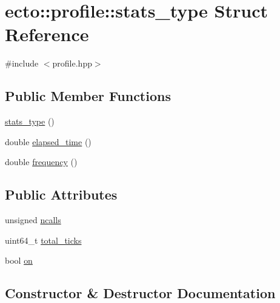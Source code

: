 \hypertarget{structecto_1_1profile_1_1stats__type}{}\section{ecto\+:\+:profile\+:\+:stats\+\_\+type Struct Reference}
\label{structecto_1_1profile_1_1stats__type}


{\ttfamily \#include $<$profile.\+hpp$>$}

\subsection*{Public Member Functions}
\begin{DoxyCompactItemize}
\item 
\hyperlink{structecto_1_1profile_1_1stats__type_ab34b76c48cbf95d269a5307a5bbb2fe8}{stats\+\_\+type} ()
\item 
double \hyperlink{structecto_1_1profile_1_1stats__type_aca1fbd5470c0485c965f62c796e3286c}{elapsed\+\_\+time} ()
\item 
double \hyperlink{structecto_1_1profile_1_1stats__type_ad595fe2ba3250310a832a776dfc53b9c}{frequency} ()
\end{DoxyCompactItemize}
\subsection*{Public Attributes}
\begin{DoxyCompactItemize}
\item 
unsigned \hyperlink{structecto_1_1profile_1_1stats__type_a570c8df89c2318ab98757e29670ba70b}{ncalls}
\item 
uint64\+\_\+t \hyperlink{structecto_1_1profile_1_1stats__type_affa2973693dec71733bcf8f7b6cf9c0b}{total\+\_\+ticks}
\item 
bool \hyperlink{structecto_1_1profile_1_1stats__type_a25c84366176dc49eb9b113a4e74c6b5a}{on}
\end{DoxyCompactItemize}


\subsection{Constructor \& Destructor Documentation}
\hypertarget{structecto_1_1profile_1_1stats__type_ab34b76c48cbf95d269a5307a5bbb2fe8}{}
